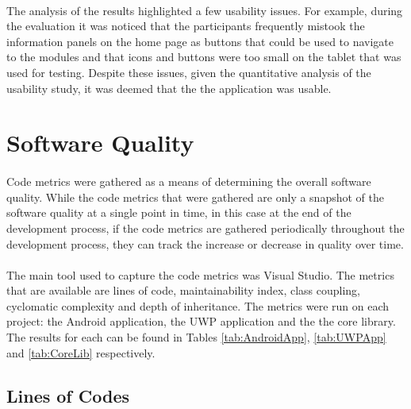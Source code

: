 {{	%
	}
	
	\paragraph{}{
	The analysis of the results highlighted a few usability issues. For example, during the evaluation it was noticed that the participants frequently mistook the information panels on the home page as buttons that could be used to navigate to the modules and that icons and buttons were too small on the tablet that was used for testing. Despite these issues, given the quantitative analysis of the usability study, it was deemed that the the application was usable.
	}		
	\label{sec:Usability}
}

\section{Software Quality}{
	\label{sec:Quality}
	\paragraph{}{
	Code metrics were gathered as a means of determining the overall software quality. While the code metrics that were gathered are only a snapshot of the software quality at a single point in time, in this case at the end of the development process, if the code metrics are gathered periodically throughout the development process, they can track the increase or decrease in quality over time.
	}
	\paragraph{}{
	The main tool used to capture the code metrics was Visual Studio. The metrics that are available are lines of code, maintainability index, class coupling, cyclomatic complexity and depth of inheritance. The metrics were run on each project: the Android application, the UWP application and the the core library. The results for each can be found in Tables \ref{tab:AndroidApp}, \ref{tab:UWPApp} and \ref{tab:CoreLib} respectively.
	}
	
	\subsection*{Lines of Codes}
}
